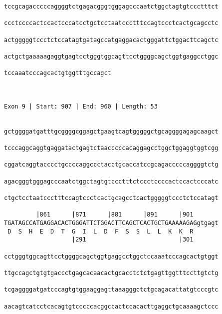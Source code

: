 \documentclass{article}
\begin{document}
\begin{Verbatim}
tccgcagacccccaggggtctgagacgggtgggagcccaatctggctagtgtccctttct
                                                            
ccctccccactccactcccatcctgctcctaatccctttccagtccctcactgcagcctc
                                                            
actgggggtccctctccatagtgatagccatgaggacactgggattctggacttcagctc
                                                            
actgctgaaaaagaggtgagtcctgggtggcagttcctggggcagctggtgaggcctggc
                                                            
tccaaatcccagcactgtggtttgccagct
                              
                              
 
Exon 9 | Start: 907 | End: 960 | Length: 53


gctggggatgatttgcggggcggagctgaagtcagtgggggctgcaggggagagcaagct
                                                            
tcccaggcaggtgaggatactgagtctaacccccacaggagcctggctggaggtggtcgg
                                                            
cggatcaggtacccctgccccaggccctacctgcaccatccgcagacccccaggggtctg
                                                            
agacgggtgggagcccaatctggctagtgtccctttctccctccccactccactcccatc
                                                            
ctgctcctaatccctttccagtccctcactgcagcctcactgggggtccctctccatagt
                                                            
         |861      |871      |881      |891      |901       
TGATAGCCATGAGGACACTGGGATTCTGGACTTCAGCTCACTGCTGAAAAAGAGgtgagt
 D  S  H  E  D  T  G  I  L  D  F  S  S  L  L  K  K  R       
                   |291                          |301       
  
cctgggtggcagttcctggggcagctggtgaggcctggctccaaatcccagcactgtggt
                                                            
ttgccagctgtgtgaccctgagcacaacactgcacctctctgagttggtttccttgtctg
                                                            
tcgaggggatgatcccagtgtggaaggagttaaagggctctgcagacattatgtcccgtc
                                                            
aacagtcatcctcacagtgtcccccacggccactccacacttgaggctgcaaaagctccc
                                                            

\end{Verbatim}
\end{document}
